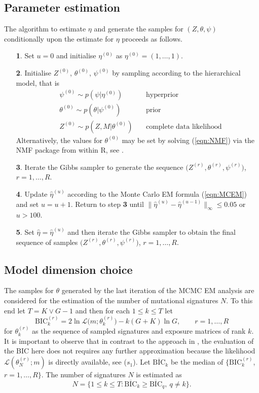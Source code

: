 \documentclass{bioinfo}
\begin{document}
\subsection{Parameter estimation}
The algorithm to estimate $\eta$ and generate the samples for $(Z,
\theta, \psi)$ conditionally upon the estimate for $\eta$ proceeds as 
follows. 
\begin{enumerate}
\item[\textbf{1}.] Set $u = 0$ and initialise $\eta^{(0)}$ as
  $\eta^{(0)} = (1, \ldots, 1)$.
\item[\textbf{2}.] Initialise $Z^{(0)}$, $\theta^{(0)}$, $\psi^{(0)}$
  by sampling according to the hierarchical model, that is
  \begin{align*}
     &\psi^{(0)} \sim p(\psi | \eta^{(0)}) &\ 
        &\text{hyperprior}\\ 
     &\theta^{(0)} \sim p(\theta | \psi^{(0)}) &\ 
        &\text{prior}\\
     &Z^{(0)} \sim p(Z, M|\theta^{(0)}) &\ 
        &\text{complete data likelihood}
  \end{align*}
  Alternatively, the values for $\theta^{(0)}$ may be set by solving 
  (\ref{eqn:NMF}) via the NMF package from within R, see
  \citealp{GS}.
\item[\textbf{3}.] Iterate the Gibbs sampler to generate the sequence
 $\big(Z^{(r)}, \theta^{(r)}, \psi^{(r)}\big)$, $r = 1, \ldots, R$.
\item[\textbf{4}.] Update $\hat\eta^{(u)}$ according to the Monte
  Carlo EM formula (\ref{eqn:MCEM}) and set $u = u+1$. Return to step
\textbf{3} until $\big\|\hat\eta^{(u)} - \hat\eta^{(u-1)}\big\|_\infty  
\leqslant 0.05$ or $u > 100$. 
\item[\textbf{5}.] Set $\hat\eta = \hat\eta^{(u)}$ and then iterate
  the Gibbs sampler to obtain the final sequence of samples
  $\big(Z^{(r)}, \theta^{(r)}, \psi^{(r)}\big)$, $r=1, \ldots,
  R$. 
\end{enumerate}

\subsection{Model dimension choice}
The samples for $\theta$ generated by the last iteration of the
MCMC EM analysis are considered for the estimation of the number 
of mutational signatures $N$. To this end let $T = K \vee G -1$ and
then for each $1 \leqslant k \leqslant T$ let
\[
  \text{BIC}_k^{(r)} = 2\ln\mathcal L\big(m;
    \theta^{(r)}_{k}\big) - k(G+K)\ln G, \qquad r =1, \ldots,
    R
\]
for $\theta^{(r)}_k$ as the sequence of sampled signatures and
exposure matrices of rank $k$. It is important to observe that in
contrast to the approach in \cite{FICMV}, the evaluation of the BIC
here does not requires any further approximation because the
likelihood $\mathcal L(\theta^{(r)}_N; m)$ is directly available, see
($s_1$).  Let $\overline{\text{BIC}}_k$ be the median of 
$\{\text{BIC}_k^{(r)}$, $r = 1, \ldots, R\}$. The number of signatures
$N$ is estimated as
\[
   N 
   = 
   \big\{1 \leqslant k \leqslant T:  \overline{\text{BIC}}_k \geqslant
    \overline{\text{BIC}}_q,\ q\neq k \big\}.
\]
\end{document}
